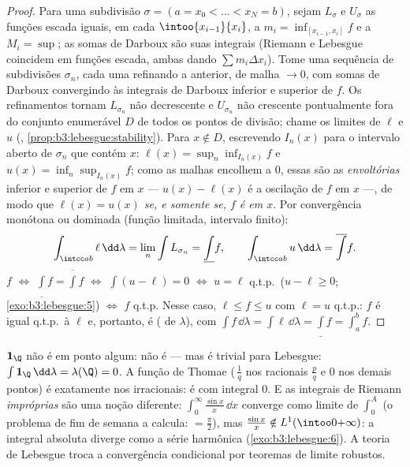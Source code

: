 \begin{proof}
Para uma subdivisão $\sigma = (a = x_0 < \dots < x_N = b)$, sejam $L_\sigma$ e $U_\sigma$ as funções escada iguais,
em cada $\intoo{x_{i-1}}{x_i}$, a $m_i = \inf_{[x_{i-1}, x_i]}f$ e a $M_i = \sup$; as somas de Darboux são suas integrais
(Riemann e Lebesgue coincidem em funções escada, ambas dando $\sum
m_i\Delta x_i$).
Tome uma sequência de subdivisões $\sigma_n$, cada uma refinando a anterior,
de malha $\to 0$, com somas de Darboux convergindo às integrais de
Darboux inferior e superior de $f$. Os refinamentos tornam $L_{\sigma_n}$ não
decrescente e $U_{\sigma_n}$ não crescente pontualmente fora do conjunto
enumerável $D$ de todos os pontos de divisão; chame os limites de
$\ell$ e $u$ (, \cref{prop:b3:lebesgue:stability}). Para $x \notin
D$,
escrevendo $I_n(x)$ para o intervalo aberto de $\sigma_n$ que contém
$x$: $\ell(x) = \sup_n\inf_{I_n(x)}f$ e $u(x) =
\inf_n\sup_{I_n(x)}f$; como as malhas encolhem a $0$, essas são as
\emph{envoltórias} inferior e superior de $f$ em $x$ --- $u(x) - \ell(x)$ é
a oscilação de $f$ em $x$ ---, de modo que \emph{$\ell(x) = u(x)$ se, e
somente se, $f$ é  em $x$}. Por convergência monótona ou
dominada (função limitada, intervalo finito):
\[
\int_{\intcc ab}\ell\,\dd\lambda = \lim_n\int L_{\sigma_n}
= \underline{\int}f,
\qquad
\int_{\intcc ab}u\,\dd\lambda = \overline{\int}f .
\]
$f$  $\iff$ $\underline\int f =
\overline\int f$ $\iff$ $\int(u - \ell) = 0$ $\iff$
$u = \ell$ q.t.p.\ ($u - \ell \geq 0$; \cref{exo:b3:lebesgue:5}) $\iff$ $f$  q.t.p.
Nesse caso, $\ell \leq f \leq u$ com $\ell =
u$ q.t.p.: $f$ é igual q.t.p.\ à  $\ell$ e, portanto, é  ( de
$\lambda$), com $\int f\,\dd\lambda = \int\ell\,\dd\lambda = \underline\int f =
\int_a^bf$.
\end{proof}

\begin{example}\label{ex:b3:lebesgue:riemannexamples}
$\mathbf 1_\Q$ não é  em ponto algum: não é  --- mas é
trivial para Lebesgue: $\int\mathbf 1_\Q\,\dd\lambda =
\lambda(\Q) = 0$. A função de Thomae (\,$\frac1q$ nos racionais
$\frac pq$ e $0$ nos demais pontos) é  exatamente nos
irracionais: é  com integral $0$. E as integrais
de Riemann \emph{impróprias} são uma noção diferente: $\int_0^\infty\frac{\sin x}x\,\dd x$ converge
como limite de $\int_0^A$ (o problema de fim de semana a calcula: $= \frac\pi2$), mas
$\frac{\sin x}x \notin L^1(\intoo0{+\infty})$: a integral absoluta diverge como a série harmônica
(\cref{exo:b3:lebesgue:6}). A teoria de Lebesgue troca a convergência
condicional por teoremas de limite robustos.
\end{example}

